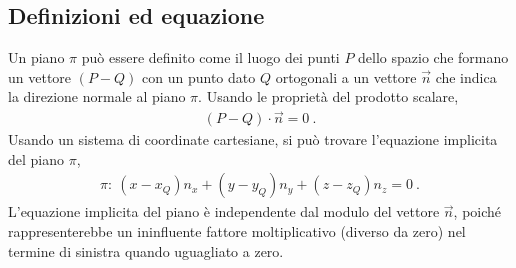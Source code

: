 \documentclass[letterpaper,10pt,italian]{jupyterBook}
\begin{document}
\subsection{Definizioni ed equazione}
\label{\detokenize{ch/analytic_geometry/analytic_geometry_3d/planes:definizioni-ed-equazione}}\label{\detokenize{ch/analytic_geometry/analytic_geometry_3d/planes:geometry-analytic-3d-planes-def}}
\sphinxAtStartPar
{}
Un piano \(\pi\) può essere definito come il luogo dei punti \(P\) dello spazio che formano un vettore \((P-Q)\) con un punto dato \(Q\) ortogonali a un vettore \(\overrightarrow{n}\) che indica la direzione normale al piano \(\pi\). Usando le proprietà del prodotto scalare,
\begin{equation*}
\begin{split}(P-Q) \cdot \overrightarrow{n} = 0 \ .\end{split}
\end{equation*}
\sphinxAtStartPar
Usando un sistema di coordinate cartesiane, si può trovare l’equazione implicita del piano \(\pi\),
\begin{equation}\label{equation:ch/analytic_geometry/analytic_geometry_3d/planes:eq:geometry:analytic:3d:planes:def-1}
\begin{split}\pi: \ (x - x_Q) n_x + (y - y_Q) n_y + (z - z_Q) n_z = 0 \ .\end{split}
\end{equation}
\sphinxAtStartPar
{} L’equazione implicita del piano è independente dal modulo del vettore \(\vec{n}\), poiché rappresenterebbe un ininfluente fattore moltiplicativo (diverso da zero) nel termine di sinistra quando uguagliato a zero.
\end{document}
